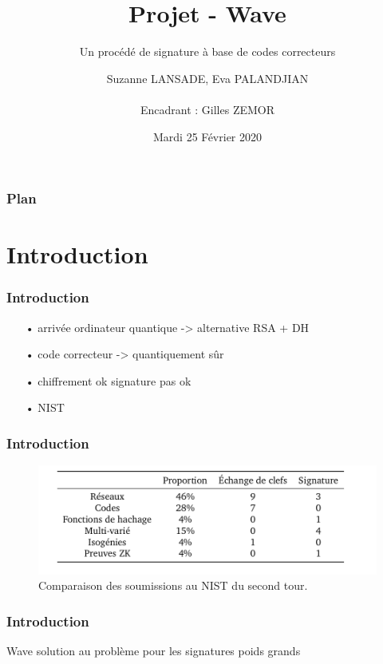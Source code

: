 \documentclass[10pt,a4paper]{beamer}
\title{Projet - Wave}
\subtitle{Un procédé de signature à base de codes correcteurs}
\author{ Suzanne LANSADE, Eva PALANDJIAN \\\quad\quad\quad\quad\quad \\Encadrant : Gilles ZEMOR}
\institute[Master CSI]{Master CSI, Université de Bordeaux, France}
\date{Mardi 25 Février 2020}
\theoremstyle{plain}
\theoremstyle{definition}
\begin{document}
\begin{frame}
  \vspace{3.5em}
  \titlepage

\end{frame}

\begin{frame}
  \frametitle{Plan}
  \tableofcontents[subsectionstyle=hide]
\end{frame}

\section{Introduction}
\begin{frame}
\frametitle{Introduction}
\begin{itemize}
\item[•] arrivée ordinateur quantique -> alternative RSA + DH 
\item[•] code correcteur -> quantiquement sûr 
\item[•] chiffrement ok signature pas ok
\item[•] NIST
\end{itemize}
\end{frame}

\begin{frame}
\frametitle{Introduction}
\begin{figure}[h]
\begin{center}
\includegraphics [scale=0.3]{../rapport/include/nist_second_tour.png}
\end{center}
\caption{\small Comparaison des soumissions au NIST du second tour.}
\end{figure}
\end{frame}

\begin{frame}
\frametitle{Introduction}
Wave solution au problème pour les signatures
poids grands
\end{frame}

\end{document}
